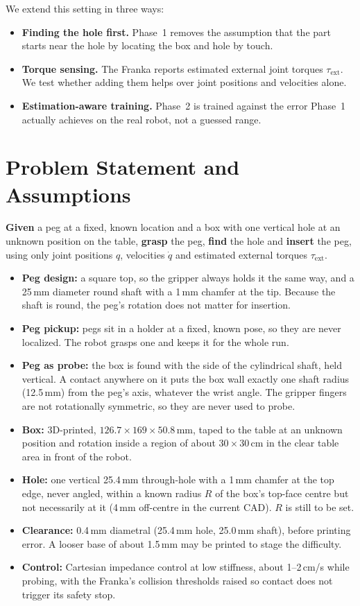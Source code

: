 \documentclass[conference]{IEEEtran}
\newcommand{\tauext}{\tau_{\mathrm{ext}}}
\begin{document}
We extend this setting in three ways:
\begin{itemize}
  \item \textbf{Finding the hole first.} Phase~1 removes the assumption that the
  part starts near the hole by locating the box and hole by touch.
  \item \textbf{Torque sensing.} The Franka reports estimated external joint
  torques $\tauext$. We test whether adding them helps over joint positions and
  velocities alone.
  \item \textbf{Estimation-aware training.} Phase~2 is trained against the error
  Phase~1 actually achieves on the real robot, not a guessed range.
\end{itemize}

\section{Problem Statement and Assumptions}

\textbf{Given} a peg at a fixed, known location and a box with one vertical hole
at an unknown position on the table, \textbf{grasp} the peg, \textbf{find} the
hole and \textbf{insert} the peg, using only joint positions $q$, velocities
$\dot q$ and estimated external torques $\tauext$.

\begin{itemize}
  \item \textbf{Peg design:} a square top, so the gripper always holds it the
  same way, and a 25\,mm diameter round shaft with a 1\,mm chamfer at the tip.
  Because the shaft is round, the peg's rotation does not matter for insertion.
  \item \textbf{Peg pickup:} pegs sit in a holder at a fixed, known pose, so they
  are never localized. The robot grasps one and keeps it for the whole run.
  \item \textbf{Peg as probe:} the box is found with the side of the
  cylindrical shaft, held vertical. A contact anywhere on it puts the box wall
  exactly one shaft radius (12.5\,mm) from the peg's axis, whatever the wrist
  angle. The gripper fingers are not rotationally symmetric, so they are never
  used to probe.
  \item \textbf{Box:} 3D-printed, $126.7\times169\times50.8$\,mm, taped to the table
  at an unknown position and rotation inside a region of about
  $30\times30$\,cm in the clear table area in front of the robot.
  \item \textbf{Hole:} one vertical 25.4\,mm through-hole with a 1\,mm chamfer
  at the top edge, never angled, within a known radius $R$ of the box's top-face
  centre but not necessarily at it (4\,mm off-centre in the current CAD). $R$ is
  still to be set.
  \item \textbf{Clearance:} 0.4\,mm diametral (25.4\,mm hole, 25.0\,mm shaft),
  before printing error. A looser base of about 1.5\,mm may be printed to stage
  the difficulty.
  \item \textbf{Control:} Cartesian impedance control at low stiffness, about
  1--2\,cm/s while probing, with the Franka's collision thresholds raised so
  contact does not trigger its safety stop.
\end{itemize}
\end{document}
